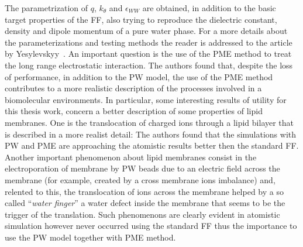 The parametrization of $q$, $k_\theta$ and $\epsilon_{WW}$ are obtained, in addition to the basic target properties of the \martini \ac{FF}, also trying to reproduce the dielectric constant, density and dipole momentum of a pure water phase. For a more details about the parameterizations and testing methods the reader is addressed to the article by Yesylevskyy \etal\,\cite{PW}. An important question is the use of the \ac{PME} method to treat the long range electrostatic interaction. The authors found that, despite the loss of performance, in addition to the \ac{PW} model, the use of the \ac{PME} method contributes to a more realistic description of the processes involved in a biomolecular environments. In particular, some interesting results of utility for this thesis work, concern a better description of some properties of lipid membranes. One is the translocation of charged ions through a lipid bilayer that is described in a more realist detail: The authors found that the simulations with \ac{PW} and \ac{PME} are approaching the atomistic results better then the standard \martini \ac{FF}. Another important phenomenon about lipid membranes consist in the electroporation of membrane by \ac{PW} beads due to an electric field across the membrane (for example, created by a cross membrane ions imbalance) and, relented to this, the translocation of ions across the membrane helped by a so called ``\textit{water finger}'' a water defect inside the membrane that seems to be the trigger of the translation. Such phenomenons are clearly evident in atomistic simulation however never occurred using the standard \martini \ac{FF} thus the importance to use the \ac{PW} model together with \ac{PME} method.


